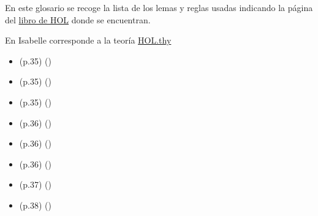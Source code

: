 %
\begin{isabellebody}%
%
%
\isadelimtheory
%
\endisadelimtheory
%
\isatagtheory
%
\endisatagtheory
{\isafoldtheory}%
%
\isadelimtheory
%
\endisadelimtheory
%
\begin{isamarkuptext}%
En este glosario se recoge la lista de los lemas y reglas usadas
  indicando la página del \href{https://acortar.link/BytjC}{libro de HOL} 
  donde se encuentran.%
\end{isamarkuptext}\isamarkuptrue%
%
\isadelimdocument
%
\endisadelimdocument
%
\isatagdocument
%
\isamarkuptrue%
%
\endisatagdocument
{\isafolddocument}%
%
\isadelimdocument
%
\endisadelimdocument
%
\begin{isamarkuptext}%
En Isabelle corresponde a la teoría 
  \href{https://acortar.link/qTQCQ}{HOL.thy}%
\end{isamarkuptext}\isamarkuptrue%
%
\begin{isamarkuptext}%
\begin{itemize}
    \item (p.35)  
      \hfill ()
    \item (p.35)  
      \hfill ()
    \item (p.35)  
      \hfill ()
    \item (p.36)  
      \hfill ()
    \item (p.36)  
      \hfill ()
    \item (p.36)  
      \hfill ()
    \item (p.37)  
      \hfill ()
    \item (p.38)  
      \hfill ()

\end{itemize}
\end{isamarkuptext}
\end{isabellebody}
